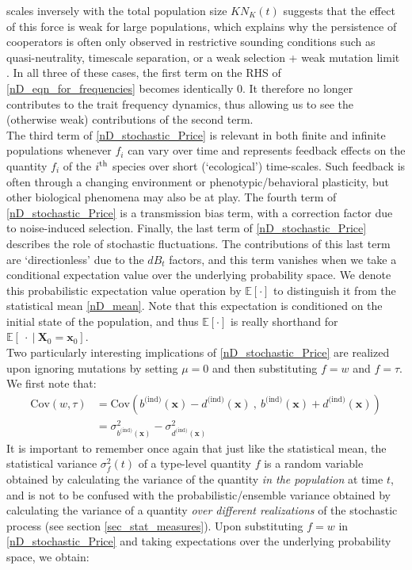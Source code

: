 scales inversely with the total population size $KN_K(t)$ suggests that the effect of this force is weak for large populations, which explains why the persistence of cooperators is often only observed in restrictive sounding conditions such as quasi-neutrality, timescale separation, or a weak selection + weak mutation limit \citep{mcleod_social_2019}. In all three of these cases, the first term on the RHS of \eqref{nD_eqn_for_frequencies} becomes identically 0. It therefore no longer contributes to the trait frequency dynamics, thus allowing us to see the (otherwise weak) contributions of the second term.\\
The third term of \eqref{nD_stochastic_Price} is relevant in both finite and infinite populations whenever $f_i$ can vary over time and represents feedback effects on the quantity $f_i$ of the $i\textsuperscript{th}$ species over short (`ecological') time-scales. Such feedback is often through a changing environment or phenotypic/behavioral plasticity, but other biological phenomena may also be at play. The fourth term of \eqref{nD_stochastic_Price} is a transmission bias term, with a correction factor due to noise-induced selection. Finally, the last term of \eqref{nD_stochastic_Price} describes the role of stochastic fluctuations. The contributions of this last term are `directionless' due to the $dB_t$ factors, and this term vanishes when we take a conditional expectation value over the underlying probability space. We denote this probabilistic expectation value operation by $\mathbb{E}[\cdot]$ to distinguish it from the statistical mean \eqref{nD_mean}. Note that this expectation is conditioned on the initial state of the population, and thus $\mathbb{E}[\cdot]$ is really shorthand for $\mathbb{E}[\ \cdot \ | \ \mathbf{X}_0 = \mathbf{x}_0]$.
\\
Two particularly interesting implications of \eqref{nD_stochastic_Price} are realized upon ignoring mutations by setting $\mu = 0$ and then substituting $f=w$ and $f = \tau$. We first note that:
\begin{align}
\textrm{Cov}(w,\tau) &=\textrm{Cov}\left( b^{\textrm{(ind)}}(\mathbf{x}) - d^{\textrm{(ind)}}(\mathbf{x}) \ , \   b^{\textrm{(ind)}}(\mathbf{x}) + d^{\textrm{(ind)}}(\mathbf{x})\right)\\
&= \sigma^2_{b^{\textrm{(ind)}}(\mathbf{x})} - \sigma^2_{d^{\textrm{(ind)}}(\mathbf{x})}\label{nD_cross_covariance}
\end{align}
It is important to remember once again that just like the statistical mean, the statistical variance $\sigma^2_{f}(t)$ of a type-level quantity $f$ is a random variable obtained by calculating the variance of the quantity \emph{in the population} at time $t$, and is not to be confused with the probabilistic/ensemble variance obtained by calculating the variance of a quantity \emph{over different realizations} of the stochastic process (see section \ref{sec_stat_measures}). Upon substituting $f = w$ in \eqref{nD_stochastic_Price} and taking expectations over the underlying probability space, we obtain:
